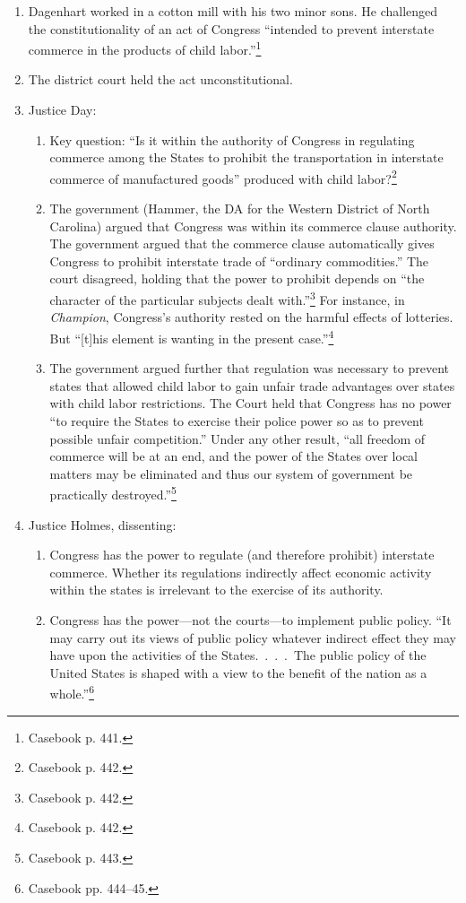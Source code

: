 \begin{enumerate}
    \item Dagenhart worked in a cotton mill with his two minor sons. He 
    challenged the constitutionality of an act of Congress ``intended to 
    prevent interstate commerce in the products of child 
    labor.''\footnote{Casebook p. 441.}
    \item The district court held the act unconstitutional.
    \item Justice Day:
    \begin{enumerate}
        \item Key question: ``Is it within the authority of Congress in 
        regulating commerce among the States to prohibit the transportation in 
        interstate commerce of manufactured goods'' produced with child 
        labor?\footnote{Casebook p. 442.}
        \item The government (Hammer, the DA for the Western District of North 
        Carolina) argued that Congress was within its commerce clause 
        authority. The government argued that the commerce clause automatically 
        gives Congress to prohibit interstate trade of ``ordinary 
        commodities.'' The court disagreed, holding that the power to prohibit 
        depends on ``the character of the particular subjects dealt 
        with.''\footnote{Casebook p. 442.} For instance, in \emph{Champion}, 
        Congress's authority rested on the harmful effects of lotteries. But 
        ``[t]his element is wanting in the present case.''\footnote{Casebook 
        p. 442.}
        \item The government argued further that regulation was necessary to 
        prevent states that allowed child labor to gain unfair trade 
        advantages over states with child labor restrictions. The Court held 
        that Congress has no power ``to require the States to exercise their 
        police power so as to prevent possible unfair competition.'' Under any 
        other result, ``all freedom of commerce will be at an end, and the 
        power of the States over local matters may be eliminated and thus our 
        system of government be practically destroyed.''\footnote{Casebook p. 
        443.}
    \end{enumerate}
    \item Justice Holmes, dissenting:
    \begin{enumerate}
        \item Congress has the power to regulate (and therefore prohibit) 
        interstate commerce. Whether its regulations indirectly affect 
        economic activity within the states is irrelevant to the exercise of 
        its authority.
        \item Congress has the power---not the courts---to implement public 
        policy. ``It may carry out its views of public policy whatever 
        indirect effect they may have upon the activities of the 
        States.~.~.~.~The public policy of the United States is shaped with a 
        view to the benefit of the nation as a whole.''\footnote{Casebook pp. 
        444--45.}
    \end{enumerate}
\end{enumerate}

